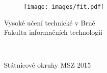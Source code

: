 \begin{titlepage}

\vspace*{1cm}

\begin{figure}[h]
  \centering
  \texttt{[image: images/fit.pdf]}
\end{figure}

\vspace*{20mm}

\begin{center}
\begin{huge}
Vysoké učení technické v Brně\\
Fakulta informačních technologií
\end{huge}
\end{center}

\vspace*{20mm}

\begin{center}
\begin{Huge}
\subject{} \\
\end{Huge}
\begin{huge}
Státnicové okruhy MSZ 2015\\
\end{huge}
\end{center}


\end{titlepage}
